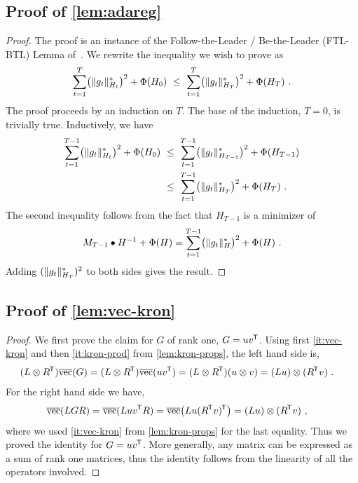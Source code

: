 \subsection{Proof of \cref{lem:adareg}}

\begin{proof}
The proof is an instance of the Follow-the-Leader / Be-the-Leader
(FTL-BTL) Lemma of~\citet{kalai2005efficient}.
%
We rewrite the inequality we wish to prove as
\begin{align*}
\sum_{t=1}^T  \mathopen{}\big(\|g_t\|_{H_t}^*\big)^2 + \Phi(H_0)
	~\le~ \sum_{t=1}^T  \mathopen{}\big(\|g_t\|_{H_T}^*\big)^2 + \Phi(H_T) ~ .
\end{align*}
The proof proceeds by an induction on $T$.
The base of the induction, $T=0$, is trivially true. Inductively, we have
\begin{align*}
\sum_{t=1}^{T-1}  \mathopen{}\big(\|g_t\|_{H_t}^*\big)^2 +
	\Phi(H_0) &~\le~ \sum_{t=1}^{T-1}  \mathopen{}\big(\|g_t\|_{H_{T-1}}^*\big)^2 +
	\Phi(H_{T-1})\\
	&~\le~ \sum_{t=1}^{T-1}  \mathopen{}\big(\|g_t\|_{H_{T}}^*\big)^2 + \Phi(H_{T}) ~.
\end{align*}
The second inequality follows from the fact that $H_{T-1}$
is a minimizer of
$$M_{T-1} \bullet H^{-1} + \Phi(H) =
	\sum_{t=1}^{T-1}  \mathopen{}\big(\|g_t\|_H^*\big)^2 + \Phi(H) ~ .$$
Adding $(\|g_t\|_{H_{T}}^*)^2$ to both sides gives the result.
\end{proof}


\subsection{Proof of \cref{lem:vec-kron}}

\begin{proof}
We first prove the claim for $G$ of rank one, $G = u v^{\mkern-1.5mu\scriptstyle\mathsf{T}}$.
Using first \ref{it:vec-kron} and then \ref{it:kron-prod} from \cref{lem:kron-props}, the left
hand side is,
\begin{align*}
(L \otimes R^{\mkern-1.5mu\scriptstyle\mathsf{T}}) \overline{\mathrm{vec}}(G)
	&= (L \otimes R^{\mkern-1.5mu\scriptstyle\mathsf{T}}) \overline{\mathrm{vec}}(u v^{\mkern-1.5mu\scriptstyle\mathsf{T}})
	 = (L \otimes R^{\mkern-1.5mu\scriptstyle\mathsf{T}}) (u\otimes v)
	 = (Lu) \otimes (R^{\mkern-1.5mu\scriptstyle\mathsf{T}} v)
	~ .
\end{align*}
For the right hand side we have,
\begin{align*}
 \overline{\mathrm{vec}}(L G R)
	&= \overline{\mathrm{vec}}(L u v^{\mkern-1.5mu\scriptstyle\mathsf{T}} R) = \overline{\mathrm{vec}}\mathopen{}\big(L u (R^{\mkern-1.5mu\scriptstyle\mathsf{T}} v)^{\mkern-1.5mu\scriptstyle\mathsf{T}}\big) = (Lu) \otimes (R^{\mkern-1.5mu\scriptstyle\mathsf{T}} v) ~ ,
\end{align*}
where we used \ref{it:vec-kron} from \cref{lem:kron-props} for the last equality. Thus we
proved the identity for $G = u v^{\mkern-1.5mu\scriptstyle\mathsf{T}}$. More generally, any matrix can be expressed as a sum of rank one matrices, thus the identity follows from the linearity of all the operators involved.
\end{proof}




